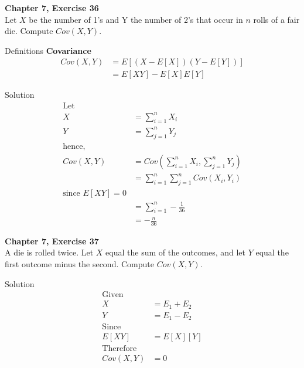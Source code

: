 \documentclass{article}
\begin{document}
\begin{spacing}{1.1}
\maketitle
\newpage
\begin{homeworkProblem}
  {\bf Chapter 7, Exercise 36}\\
  Let $X$ be the number of 1's and Y the number of 2's that occur in 
  $n$ rolls of a fair die. Compute $Cov( X, Y)$.
  \begin{homeworkSection}{Definitions}
  {\bf Covariance}\\
    \begin{align*}
      Cov( X, Y) &= E[ (X - E[X]) (Y - E[Y])] \\
      &= E[ XY] - E[ X]E[ Y]
    \end{align*}
  \end{homeworkSection}
  \begin{homeworkSection}{Solution}
    \begin{align*}
      \text{Let}\\
        X &= \sum_{i = 1}^n X_i\\
        Y &= \sum_{j = 1}^n Y_j\\
      \text{hence,}\\
        Cov( X, Y) &= Cov\left(\sum_{i = 1}^n X_i, \sum_{j = 1}^n Y_j\right)\\
        &= \sum_{i = 1}^n\sum_{j = 1}^n Cov(X_i, Y_i)\\
      \text{since $E[XY] = 0$}\\
        &= \sum_{i = 1}^n -\frac{ 1}{36}\\
        &= -\frac{ n}{ 36}
    \end{align*}
  \end{homeworkSection}
\end{homeworkProblem}

\newpage
\begin{homeworkProblem}
  {\bf Chapter 7, Exercise 37}\\
  A die is rolled twice. Let $X$ equal the sum of the outcomes, and 
  let $Y$ equal the first outcome minus the second. Compute $Cov(X, Y)$.
  \begin{homeworkSection}{Solution}
    \begin{align*}
      \text{Given}\\
        X &= E_1 + E_2\\
        Y &= E_1 - E_2\\
      \text{Since}\\
        E[XY] &= E[X][Y]\\
      \text{Therefore}\\
        Cov(X, Y) &= 0
    \end{align*}
  \end{homeworkSection}
\end{homeworkProblem}


\end{spacing}
\end{document}
